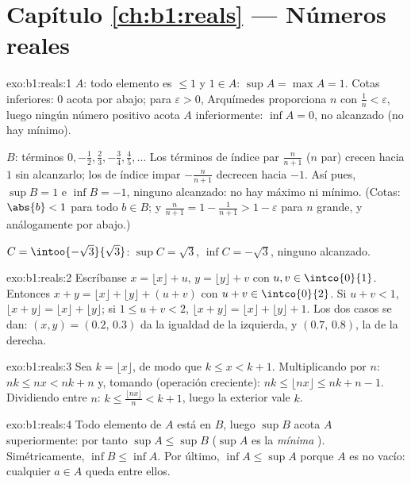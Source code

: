 \section*{Capítulo \ref{ch:b1:reals} --- Números reales}

\begin{solution}{exo:b1:reals:1}
$A$: todo elemento es $\leq 1$ y $1 \in A$: $\sup A = \max A = 1$.
Cotas inferiores: $0$ acota por abajo; para $\varepsilon > 0$,
Arquímedes proporciona $n$ con $\frac 1n < \varepsilon$, luego ningún
número positivo acota $A$ inferiormente: $\inf A = 0$, no alcanzado
(no hay mínimo).

$B$: términos $0, -\frac12, \frac23, -\frac34, \frac45, \dots$ Los
términos de índice par $\frac{n}{n+1}$ ($n$ par) crecen hacia $1$ sin
alcanzarlo; los de índice impar $-\frac{n}{n+1}$ decrecen hacia $-1$.
Así pues, $\sup B = 1$ e $\inf B = -1$, ninguno alcanzado: no hay
máximo ni mínimo. (Cotas: $\abs{b} < 1$ para todo $b \in B$; y
$\frac{n}{n+1} = 1 - \frac{1}{n+1} > 1 - \varepsilon$ para $n$ grande,
y análogamente por abajo.)

$C = \intoo{-\sqrt 3}{\sqrt 3}$: $\sup C = \sqrt 3$, $\inf C =
-\sqrt 3$, ninguno alcanzado.
\end{solution}

\begin{solution}{exo:b1:reals:2}
Escríbanse $x = \lfloor x \rfloor + u$, $y = \lfloor y \rfloor + v$
con $u, v \in \intco{0}{1}$. Entonces $x + y = \lfloor x \rfloor +
\lfloor y \rfloor + (u + v)$ con $u + v \in \intco{0}{2}$. Si
$u + v < 1$, $\lfloor x + y\rfloor = \lfloor x\rfloor + \lfloor y
\rfloor$; si $1 \leq u + v < 2$, $\lfloor x+y \rfloor = \lfloor x
\rfloor + \lfloor y \rfloor + 1$. Los dos casos se dan:
$(x, y) = (0.2,\, 0.3)$ da la igualdad de la izquierda, y
$(0.7,\, 0.8)$, la de la derecha.
\end{solution}

\begin{solution}{exo:b1:reals:3}
Sea $k = \lfloor x \rfloor$, de modo que $k \leq x < k + 1$.
Multiplicando por $n$: $nk \leq nx < nk + n$ y, tomando  (operación creciente): $nk \leq \lfloor nx \rfloor \leq nk +
n - 1$. Dividiendo entre $n$: $k \leq \frac{\lfloor nx \rfloor}{n} <
k + 1$, luego la  exterior vale $k$.
\end{solution}

\begin{solution}{exo:b1:reals:4}
Todo elemento de $A$ está en $B$, luego $\sup B$ acota $A$
superiormente: por tanto $\sup A \leq \sup B$ ($\sup A$ es la
\emph{mínima} ). Simétricamente, $\inf B \leq \inf A$.
Por último, $\inf A \leq \sup A$ porque $A$ es no vacío: cualquier
$a \in A$ queda entre ellos.
\end{solution}

